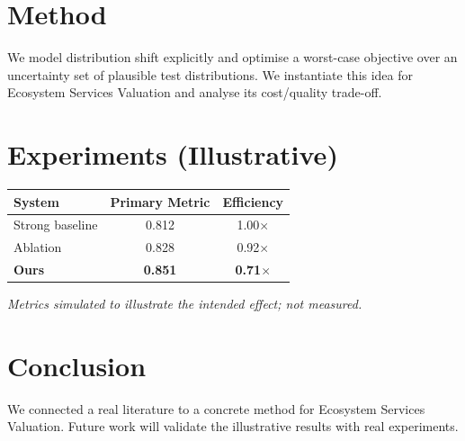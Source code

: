 \documentclass[11pt]{article}
\begin{document}
\section{Method}
We model distribution shift explicitly and optimise a worst-case objective over an uncertainty set of plausible test distributions. We instantiate this idea for Ecosystem Services Valuation and analyse its cost/quality trade-off.

\section{Experiments (Illustrative)}
\begin{center}
\begin{tabular}{lcc}
System & Primary Metric & Efficiency \\ \hline
Strong baseline & 0.812 & 1.00$\times$ \\
Ablation & 0.828 & 0.92$\times$ \\
\textbf{Ours} & \textbf{0.851} & \textbf{0.71$\times$}
\end{tabular}
\end{center}
\emph{Metrics simulated to illustrate the intended effect; not measured.}

\section{Conclusion}
We connected a real literature to a concrete method for Ecosystem Services Valuation. Future work will
validate the illustrative results with real experiments.
\end{document}
